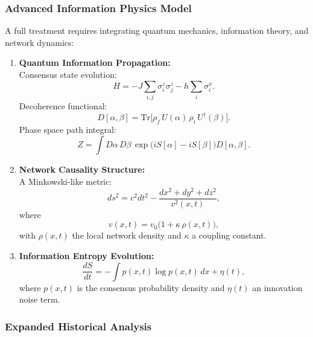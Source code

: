 \documentclass[11pt]{article}
\begin{document}
\subsubsection{Advanced Information Physics Model}

A full treatment requires integrating quantum mechanics, information theory, and network dynamics:
\begin{enumerate}[label=(\arabic*)]
    \item \textbf{Quantum Information Propagation:} \\
    Consensus state evolution:
    \[
    H = -J\sum_{i,j}\sigma_i^z\sigma_j^z - h\sum_i \sigma_i^x.
    \]
    Decoherence functional:
    \[
    D[\alpha,\beta]=\text{Tr}\bigl[\rho_f\,U(\alpha)\,\rho_i\,U^\dagger(\beta)\bigr].
    \]
    Phase space path integral:
    \[
    Z=\int D\alpha\,D\beta\, \exp\bigl(iS[\alpha]-iS[\beta]\bigr) D[\alpha,\beta].
    \]
    
    \item \textbf{Network Causality Structure:} \\
    A Minkowski-like metric:
    \[
    ds^2 = c^2 dt^2 - \frac{dx^2+dy^2+dz^2}{v^2(x,t)},
    \]
    where
    \[
    v(x,t)=v_0\bigl(1+\kappa\,\rho(x,t)\bigr),
    \]
    with $\rho(x,t)$ the local network density and $\kappa$ a coupling constant.
    
    \item \textbf{Information Entropy Evolution:} \\
    \[
    \frac{dS}{dt} = -\int p(x,t)\log p(x,t)\,dx + \eta(t),
    \]
    where $p(x,t)$ is the consensus probability density and $\eta(t)$ an innovation noise term.
\end{enumerate}

\subsubsection{Expanded Historical Analysis}
\end{document}
